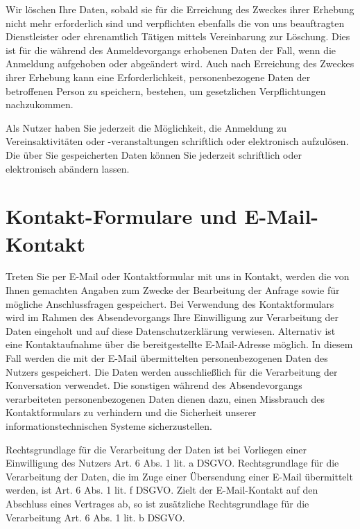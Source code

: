 \documentclass[
  fontsize=12pt,
  paper=a4,
  DIV14,
  parskip,
]{scrartcl}
\begin{document}
Wir löschen Ihre Daten, sobald sie für die Erreichung des Zweckes ihrer
Erhebung nicht mehr erforderlich sind und verpflichten ebenfalls die von uns
beauftragten Dienstleister oder ehrenamtlich Tätigen mittels Vereinbarung zur
Löschung.
Dies ist für die während des Anmeldevorgangs erhobenen Daten der Fall, wenn
die Anmeldung aufgehoben oder abgeändert wird. Auch nach Erreichung des
Zweckes ihrer Erhebung kann eine Erforderlichkeit, personenbezogene Daten der
betroffenen Person zu speichern, bestehen, um gesetzlichen Verpflichtungen
nachzukommen.

Als Nutzer haben Sie jederzeit die Möglichkeit, die Anmeldung zu
Vereinsaktivitäten oder -veranstaltungen schriftlich oder elektronisch
aufzulösen. Die über Sie gespeicherten Daten können Sie jederzeit schriftlich
oder elektronisch abändern lassen.

\section{Kontakt-Formulare und E-Mail-Kontakt}

Treten Sie per E-Mail oder Kontaktformular mit uns in Kontakt, werden die von
Ihnen gemachten Angaben zum Zwecke der Bearbeitung der Anfrage sowie für
mögliche Anschlussfragen gespeichert.
Bei Verwendung des Kontaktformulars wird im Rahmen des Absendevorgangs Ihre
Einwilligung zur Verarbeitung der Daten eingeholt und auf diese
Datenschutzerklärung verwiesen.
Alternativ ist eine Kontaktaufnahme über die bereitgestellte E-Mail-Adresse
möglich. In diesem Fall werden die mit der E-Mail übermittelten
personenbezogenen Daten des Nutzers gespeichert.
Die Daten werden ausschließlich für die Verarbeitung der Konversation
verwendet.
Die sonstigen während des Absendevorgangs verarbeiteten personenbezogenen
Daten dienen dazu, einen Missbrauch des Kontaktformulars zu verhindern und
die Sicherheit unserer informationstechnischen Systeme sicherzustellen.

Rechtsgrundlage für die Verarbeitung der Daten ist bei Vorliegen einer
Einwilligung des Nutzers Art. 6 Abs. 1 lit. a DSGVO. Rechtsgrundlage für die
Verarbeitung der Daten, die im Zuge einer Übersendung einer E-Mail
übermittelt werden, ist Art. 6 Abs. 1 lit. f DSGVO.
Zielt der E-Mail-Kontakt auf den Abschluss eines Vertrages ab, so ist
zusätzliche Rechtsgrundlage für die Verarbeitung Art. 6 Abs. 1 lit. b DSGVO.
\end{document}
